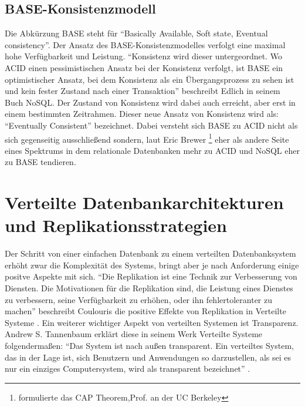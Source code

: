 \documentclass[a4paper,11pt,oneside,%
headsepline,												%
footsepline,												%
bibtotocnumbered									%
]{scrreprt}
\begin{document}
\subsection{BASE-Konsistenzmodell}
\label{BASE}
Die Abkürzung BASE steht für \enquote{Basically Available, Soft state, Eventual consistency}. Der Ansatz des BASE-Konsistenzmodelles verfolgt eine maximal hohe Verfügbarkeit und Leistung. \enquote{Konsistenz wird dieser untergeordnet. Wo ACID einen pessimistischen Ansatz bei der Konsistenz verfolgt, ist BASE ein optimistischer Ansatz, bei dem Konsistenz als ein Übergangsprozess zu sehen ist und kein fester Zustand nach einer Transaktion} beschreibt Edlich in seinem Buch NoSQL\autocite[33, 34]{Edlich2010}. Der Zustand von Konsistenz wird dabei auch erreicht, aber erst in einem bestimmten Zeitrahmen. Dieser neue Ansatz von Konsistenz wird als: \enquote{Eventually Consistent} bezeichnet. Dabei versteht sich BASE zu ACID nicht als sich gegenseitig ausschließend sondern, laut Eric Brewer \footnote{formulierte das CAP Theorem,Prof. an der UC Berkeley} eher als andere Seite eines Spektrums in dem relationale Datenbanken mehr zu ACID und NoSQL eher zu BASE tendieren.

\section{Verteilte Datenbankarchitekturen und Replikationsstrategien}
\label{sec:VertDB}
Der Schritt von einer einfachen Datenbank zu einem verteilten Datenbanksystem erhöht zwar die Komplexität des Systems, bringt aber je nach Anforderung einige positve Aspekte mit sich. \enquote{Die Replikation ist eine Technik zur Verbesserung von Diensten. Die Motivationen für die Replikation sind, die Leistung eines Dienstes zu verbessern, seine Verfügbarkeit zu erhöhen, oder ihn fehlertoleranter zu machen} beschreibt Coulouris die positive Effekte von Replikation in Verteilte Systeme \autocite[642]{Coulouris2002}. Ein weiterer wichtiger Aspekt von verteilten Systemen ist Transparenz. Andrew S. Tannenbaum erklärt diese in seinem Werk Verteilte Systeme folgendermaßen: \enquote{Das System ist nach außen transparent. Ein verteiltes System, das in der Lage ist, sich Benutzern und Anwendungen so darzustellen, als sei es nur ein einziges Computersystem, wird als transparent bezeichnet} \autocite[21]{Tannenbaum2008}.
\end{document}

